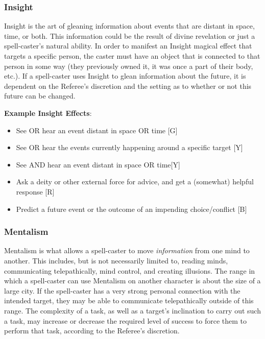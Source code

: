 \documentclass[oneside]{book}
\begin{document}
\begin{multicols}{2}
\subsubsection{Insight}
Insight is the art of gleaning information about events that are distant in space, time, or both. This information could be the result of divine revelation or just a spell-caster's natural ability. In order to manifest an Insight magical effect that targets a specific person, the caster must have an object that is connected to that person in some way (they previously owned it, it was once a part of their body, etc.). If a spell-caster uses Insight to glean information about the future, it is dependent on the Referee's discretion and the setting as to whether or not this future can be changed.

\textbf{Example Insight Effects}:
	\begin{itemize}
		\setlength{\itemsep}{0cm}%
  		\setlength{\parskip}{0cm}%
		\item{ \small See OR hear an event distant in space OR time [G]}
		\item{ \small See OR hear the events currently happening around a specific target [Y]}
		\item{ \small See AND hear an event distant in space OR time[Y]}
		\item{ \small Ask a deity or other external force for advice, and get a (somewhat) helpful response [R]}
		\item{ \small Predict a future event or the outcome of an impending choice/conflict [B]}
	\end{itemize}

\subsubsection{Mentalism}
Mentalism is what allows a spell-caster to move \emph{information} from one mind to another. This includes, but is not necessarily limited to, reading minds, communicating telepathically, mind control, and creating illusions. The range in which a spell-caster can use Mentalism on another character is about the size of a large city. If the spell-caster has a very strong personal connection with the intended target, they may be able to communicate telepathically outside of this range. The complexity of a task, as well as a target's inclination to carry out such a task, may increase or decrease the required level of success to force them to perform that task, according to the Referee's discretion.


\end{multicols}
\end{document}
